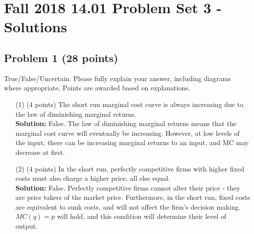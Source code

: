 \documentclass{article}
\begin{document}
\section*{Fall 2018 14.01 Problem Set 3 - Solutions}

\subsection*{Problem 1 (28 points)}
True/False/Uncertain. Please fully explain your answer, including diagrams where appropriate. Points are awarded based on explanations.

\begin{enumerate}
\item[(1)] (4 points) The short run marginal cost curve is always increasing due to the law of diminishing marginal returns. \\
\textbf{Solution:} False. The law of diminishing marginal returns means that the marginal cost curve will eventually be increasing. However, at low levels of the input, there can be increasing marginal returns to an input, and MC may decrease at first.

\item[(2)] (4 points) In the short run, perfectly competitive firms with higher fixed costs must also charge a higher price, all else equal. \\
\textbf{Solution:} False. Perfectly competitive firms cannot alter their price - they are price takers of the market price. Furthermore, in the short run, fixed costs are equivalent to sunk costs, and will not affect the firm's decision making. \(MC(q) = p\) will hold, and this condition will determine their level of output.

\end{enumerate}

\end{document}
